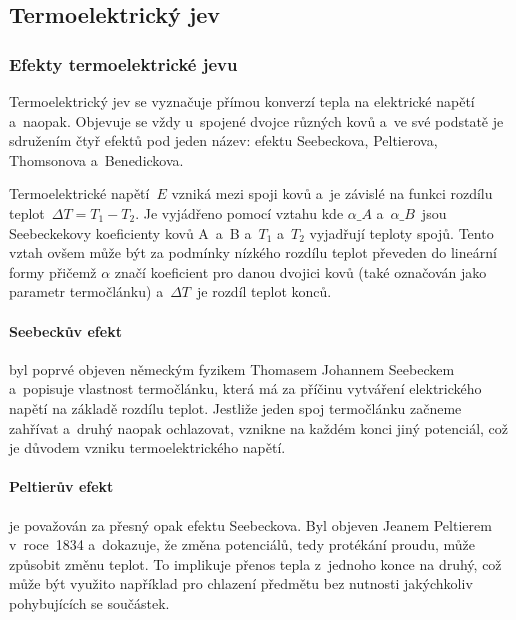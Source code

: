\subsection{Termoelektrický jev}
\subsubsection{Efekty termoelektrické jevu}
\label{sec:efekty-termoelektrika}
Termoelektrický jev se vyznačuje přímou konverzí tepla na elektrické napětí
a~naopak. Objevuje se vždy u~spojené dvojce různých kovů a~ve své podstatě je
sdružením čtyř efektů pod jeden název: efektu Seebeckova, Peltierova,
Thomsonova a~Benedickova.~

Termoelektrické napětí~$E$ vzniká mezi spoji kovů a~je závislé na funkci
rozdílu teplot~$\Delta T = T_1 - T_2$. Je vyjádřeno pomocí vztahu
kde $\alpha\_A$ a~$\alpha\_B$~jsou  Seebeckekovy koeficienty kovů A~a~B a~$T_1$
a~$T_2$ vyjadřují teploty spojů. Tento vztah ovšem může být za podmínky
nízkého rozdílu teplot převeden do lineární formy
přičemž $\alpha$ značí koeficient pro danou dvojici kovů (také označován jako
parametr termočlánku) a~$\Delta T$~je rozdíl teplot konců.~\cite{diplomka}

\paragraph{Seebeckův efekt} byl poprvé objeven německým fyzikem Thomasem
Johannem Seebeckem a~popisuje vlastnost termočlánku, která má za příčinu
vytváření elektrického napětí na základě rozdílu teplot. Jestliže jeden spoj
termočlánku začneme zahřívat a~druhý naopak ochlazovat, vznikne na každém konci
jiný potenciál, což je důvodem vzniku termoelektrického
napětí.~\cite{jreichl-seebeck}

\paragraph{Peltierův efekt} je považován za přesný opak efektu Seebeckova. Byl
objeven Jeanem Peltierem v~roce~1834 a~dokazuje, že změna potenciálů, tedy
protékání proudu, může způsobit změnu teplot. To implikuje přenos tepla
z~jednoho konce na druhý, což může být využito například pro chlazení předmětu
bez nutnosti jakýchkoliv pohybujících se součástek.~

